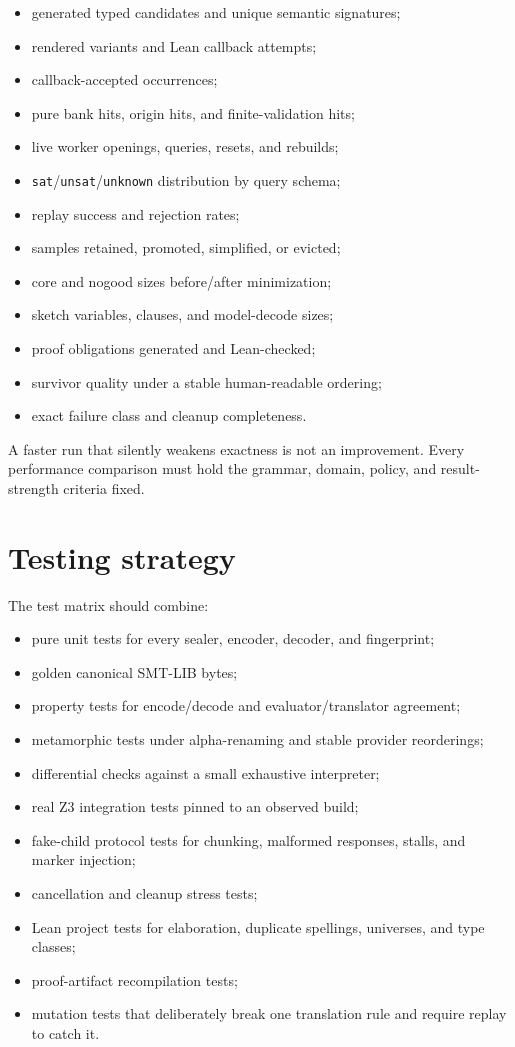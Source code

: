 \documentclass[10pt,letterpaper,oneside]{report}
\newcommand{\sat}{\texttt{sat}}
\newcommand{\unsat}{\texttt{unsat}}
\newcommand{\unknown}{\texttt{unknown}}
\begin{document}
\begin{itemize}
\item generated typed candidates and unique semantic signatures;
\item rendered variants and Lean callback attempts;
\item callback-accepted occurrences;
\item pure bank hits, origin hits, and finite-validation hits;
\item live worker openings, queries, resets, and rebuilds;
\item \sat/\unsat/\unknown{} distribution by query schema;
\item replay success and rejection rates;
\item samples retained, promoted, simplified, or evicted;
\item core and nogood sizes before/after minimization;
\item sketch variables, clauses, and model-decode sizes;
\item proof obligations generated and Lean-checked;
\item survivor quality under a stable human-readable ordering;
\item exact failure class and cleanup completeness.
\end{itemize}

A faster run that silently weakens exactness is not an improvement. Every performance comparison must hold the grammar, domain, policy, and result-strength criteria fixed.

\section{Testing strategy}

The test matrix should combine:

\begin{itemize}
\item pure unit tests for every sealer, encoder, decoder, and fingerprint;
\item golden canonical SMT-LIB bytes;
\item property tests for encode/decode and evaluator/translator agreement;
\item metamorphic tests under alpha-renaming and stable provider reorderings;
\item differential checks against a small exhaustive interpreter;
\item real Z3 integration tests pinned to an observed build;
\item fake-child protocol tests for chunking, malformed responses, stalls, and marker injection;
\item cancellation and cleanup stress tests;
\item Lean project tests for elaboration, duplicate spellings, universes, and type classes;
\item proof-artifact recompilation tests;
\item mutation tests that deliberately break one translation rule and require replay to catch it.
\end{itemize}
\end{document}
